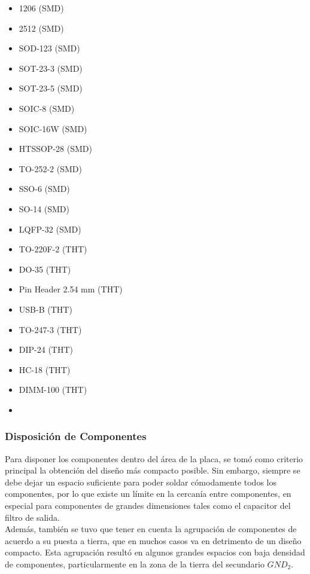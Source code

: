 \begin{multicols}{3}
    \begin{itemize}
        \item 1206 (SMD)
        \item 2512 (SMD)
        \item SOD-123 (SMD)
        \item SOT-23-3 (SMD)
        \item SOT-23-5 (SMD)
        \item SOIC-8 (SMD)
        \item SOIC-16W (SMD)
        \item HTSSOP-28 (SMD)
        \item TO-252-2 (SMD)
        \item SSO-6 (SMD)
        \item SO-14 (SMD)
        \item LQFP-32 (SMD)
        \item TO-220F-2 (THT)
        \item DO-35 (THT)
        \item Pin Header 2.54 mm (THT)
        \item USB-B (THT)
        \item TO-247-3 (THT)
        \item DIP-24 (THT)
        \item HC-18 (THT)
        \item DIMM-100 (THT)
        \item[\vspace{\fill}]       %
    \end{itemize}
\end{multicols}

\subsubsection{Disposición de Componentes}

Para disponer los componentes dentro del área de la placa, se tomó como criterio principal la obtención del diseño más compacto posible. Sin embargo, siempre se debe dejar un espacio suficiente para poder soldar cómodamente todos los componentes, por lo que existe un límite en la cercanía entre componentes, en especial para componentes de grandes dimensiones tales como el capacitor del filtro de salida.\\

Además, también se tuvo que tener en cuenta la agrupación de componentes de acuerdo a su puesta a tierra, que en muchos casos va en detrimento de un diseño compacto. Esta agrupación resultó en algunos grandes espacios con baja densidad de componentes, particularmente en la zona de la tierra del secundario $GND_2$.\\

